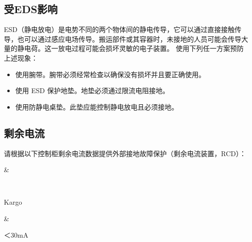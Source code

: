 \documentclass[a4paper,11pt,english,openany,oneside]{sphinxmanual}
\renewcommand{\sphinxstyletheadfamily}{
\color{white}\bfseries
}
\begin{document}
\subsection{受EDS影响}
\label{\detokenize{07 _u6280_u672f_u89c4_u683c:eds}}\label{\detokenize{07 _u6280_u672f_u89c4_u683c:id13}}
\sphinxAtStartPar
ESD（静电放电）是电势不同的两个物体间的静电传导，它可以通过直接接触传导，也可以通过感应电场传导。搬运部件或其容器时，未接地的人员可能会传导大量的静电荷。这一放电过程可能会损坏灵敏的电子装置。
使用下列任一方案预防上述现象：
\begin{itemize}
\item {} 
\sphinxAtStartPar
使用腕带。腕带必须经常检查以确保没有损坏并且要正确使用。

\item {} 
\sphinxAtStartPar
使用 ESD 保护地垫。地垫必须通过限流电阻接地。

\item {} 
\sphinxAtStartPar
使用防静电桌垫。此垫应能控制静电放电且必须接地。

\end{itemize}


\subsection{剩余电流}
\label{\detokenize{07 _u6280_u672f_u89c4_u683c:id14}}\label{\detokenize{07 _u6280_u672f_u89c4_u683c:id15}}
\sphinxAtStartPar
请根据以下控制柜剩余电流数据提供外部接地故障保护（剩余电流装置，RCD）：


\begin{savenotes}\sphinxattablestart
\sphinxthistablewithglobalstyle
\centering
{}
\sphinxthecaptionisattop
{}\label{\detokenize{07 _u6280_u672f_u89c4_u683c:id61}}
\sphinxaftertopcaption
\begin{tabular}[t]{}
\sphinxtoprule
\begin{varwidth}[t]{}
\sphinxstyletheadfamily \sphinxAtStartPar
{}
\sphinxbeforeendvarwidth
\end{varwidth}%
&\begin{varwidth}[t]{}
\sphinxstyletheadfamily \sphinxAtStartPar
{}
\sphinxbeforeendvarwidth
\end{varwidth}%
\\
\sphinxmidrule
\sphinxtableatstartofbodyhook\begin{varwidth}[t]{}
\sphinxAtStartPar
Kargo
\sphinxbeforeendvarwidth
\end{varwidth}%
&\begin{varwidth}[t]{}
\sphinxAtStartPar
＜30mA
\sphinxbeforeendvarwidth
\end{varwidth}%
\\
\sphinxbottomrule
\end{tabular}
\sphinxtableafterendhook\par
\sphinxattableend\end{savenotes}
\end{document}
